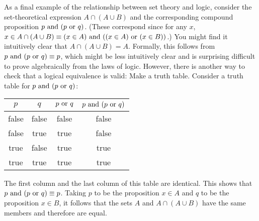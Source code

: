 \medbreak

As a final example of the relationship between set theory and logic,
consider the set-theoretical expression $A\cap (A\cup B)$ and
the corresponding compound proposition $p\text{ and }(p\text{ or } q)$.  (These
correspond since for any $x$, $x\in A\cap(A\cup B) \equiv
(x\in A)\text{ and } ((x\in A)\text{ or } (x\in B))$.)  You might find it intuitively
clear that $A\cap(A\cup B)=A$.  Formally, this follows from
$p\text{ and }(p\text{ or } q)\equiv p$, which might be less intuitively
clear and is surprising difficult to prove algebraically from the laws
of logic.  However, there is another way to check that a logical
equivalence is valid: Make a truth table.  Consider a truth table
for $p\text{ and }(p\text{ or } q)$:
   \begin{center}
     \begin{tabular}{|c|c||c|c|}
        \hline
        $p$& $q$& $p\text{ or } q$& $p\text{ and } (p\text{ or } q)$\\
        \hline
        \strut 
        false&  false&  false&  false\\
        false&  true&   true&   false \\
        true&   false&  true&   true \\
        true&   true&   true&   true  \\
        \hline
      \end{tabular}
   \end{center}
The first column and the last column of this table are
identical.
This shows that $p\text{ and }(p\text{ or } q)\equiv p$.  Taking $p$ to 
be the proposition $x\in A$ and $q$ to be the proposition $x\in B$,
it follows that the sets $A$ and $A\cap (A\cup B)$ have the same
members and therefore are equal.


